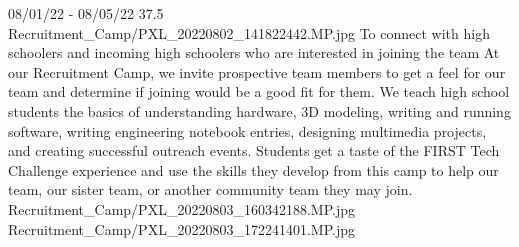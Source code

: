 {08/01/22 - 08/05/22}
{37.5}
{Recruitment_Camp/PXL_20220802_141822442.MP.jpg}
{To connect with high schoolers and incoming high schoolers who are interested in joining the team}
{At our Recruitment Camp, we invite prospective team members to get a feel for our team and determine if joining would be a good fit for them. We teach high school students the basics of understanding hardware, 3D modeling, writing and running software, writing engineering notebook entries, designing multimedia projects, and creating successful outreach events. Students get a taste of the FIRST Tech Challenge experience and use the skills they develop from this camp to help our team, our sister team, or another community team they may join.
} 
{Recruitment_Camp/PXL_20220803_160342188.MP.jpg}
{Recruitment_Camp/PXL_20220803_172241401.MP.jpg}